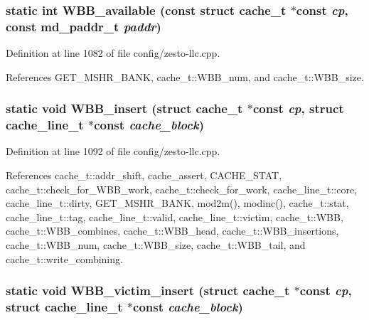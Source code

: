 \subsubsection[{WBB\_\-available}]{\setlength{\rightskip}{0pt plus 5cm}static int WBB\_\-available (const struct {\bf cache\_\-t} $\ast$const  {\em cp}, \/  const {\bf md\_\-paddr\_\-t} {\em paddr})\hspace{0.3cm}{\tt  [inline, static]}}\label{config_2zesto-llc_8cpp_48f8188c331e3c2188868d0f1c577d5a}




Definition at line 1082 of file config/zesto-llc.cpp.

References GET\_\-MSHR\_\-BANK, cache\_\-t::WBB\_\-num, and cache\_\-t::WBB\_\-size.
\subsubsection[{WBB\_\-insert}]{\setlength{\rightskip}{0pt plus 5cm}static void WBB\_\-insert (struct {\bf cache\_\-t} $\ast$const  {\em cp}, \/  struct {\bf cache\_\-line\_\-t} $\ast$const  {\em cache\_\-block})\hspace{0.3cm}{\tt  [static]}}\label{config_2zesto-llc_8cpp_54a68443796a201ceb5456ce0fc69bc4}




Definition at line 1092 of file config/zesto-llc.cpp.

References cache\_\-t::addr\_\-shift, cache\_\-assert, CACHE\_\-STAT, cache\_\-t::check\_\-for\_\-WBB\_\-work, cache\_\-t::check\_\-for\_\-work, cache\_\-line\_\-t::core, cache\_\-line\_\-t::dirty, GET\_\-MSHR\_\-BANK, mod2m(), modinc(), cache\_\-t::stat, cache\_\-line\_\-t::tag, cache\_\-line\_\-t::valid, cache\_\-line\_\-t::victim, cache\_\-t::WBB, cache\_\-t::WBB\_\-combines, cache\_\-t::WBB\_\-head, cache\_\-t::WBB\_\-insertions, cache\_\-t::WBB\_\-num, cache\_\-t::WBB\_\-size, cache\_\-t::WBB\_\-tail, and cache\_\-t::write\_\-combining.
\subsubsection[{WBB\_\-victim\_\-insert}]{\setlength{\rightskip}{0pt plus 5cm}static void WBB\_\-victim\_\-insert (struct {\bf cache\_\-t} $\ast$const  {\em cp}, \/  struct {\bf cache\_\-line\_\-t} $\ast$const  {\em cache\_\-block})\hspace{0.3cm}{\tt  [static]}}\label{config_2zesto-llc_8cpp_4a2ea45f307de25eaffcd48354e67a18}




